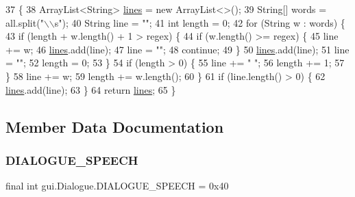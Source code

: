\begin{DoxyCode}
37                                                                          \{
38         ArrayList<String> \mbox{\hyperlink{classgui_1_1_dialogue_a83efa9d7d08512fd59390c8ecaade1f7}{lines}} = \textcolor{keyword}{new} ArrayList<>();
39         String[] words = all.split(\textcolor{stringliteral}{"\(\backslash\)\(\backslash\)s"});
40         String line = \textcolor{stringliteral}{""};
41         \textcolor{keywordtype}{int} length = 0;
42         \textcolor{keywordflow}{for} (String w : words) \{
43             \textcolor{keywordflow}{if} (length + w.length() + 1 > regex) \{
44                 \textcolor{keywordflow}{if} (w.length() >= regex) \{
45                     line += w;
46                     \mbox{\hyperlink{classgui_1_1_dialogue_a83efa9d7d08512fd59390c8ecaade1f7}{lines}}.add(line);
47                     line = \textcolor{stringliteral}{""};
48                     \textcolor{keywordflow}{continue};
49                 \}
50                 \mbox{\hyperlink{classgui_1_1_dialogue_a83efa9d7d08512fd59390c8ecaade1f7}{lines}}.add(line);
51                 line = \textcolor{stringliteral}{""};
52                 length = 0;
53             \}
54             \textcolor{keywordflow}{if} (length > 0) \{
55                 line += \textcolor{stringliteral}{" "};
56                 length += 1;
57             \}
58             line += w;
59             length += w.length();
60         \}
61         \textcolor{keywordflow}{if} (line.length() > 0) \{
62             \mbox{\hyperlink{classgui_1_1_dialogue_a83efa9d7d08512fd59390c8ecaade1f7}{lines}}.add(line);
63         \}
64         \textcolor{keywordflow}{return} \mbox{\hyperlink{classgui_1_1_dialogue_a83efa9d7d08512fd59390c8ecaade1f7}{lines}};
65     \}
\end{DoxyCode}


\subsection{Member Data Documentation}
\mbox{\label{classgui_1_1_dialogue_a4cc16d7f84aecd1afefd997c6bcd25e0}} 
\subsubsection{\texorpdfstring{D\+I\+A\+L\+O\+G\+U\+E\+\_\+\+S\+P\+E\+E\+CH}{DIALOGUE\_SPEECH}}
{\footnotesize\ttfamily final int gui.\+Dialogue.\+D\+I\+A\+L\+O\+G\+U\+E\+\_\+\+S\+P\+E\+E\+CH = 0x40\hspace{0.3cm}{\ttfamily [static]}}

